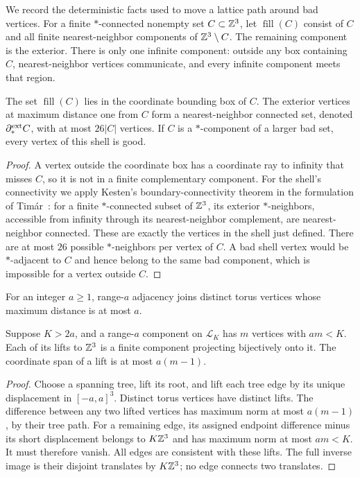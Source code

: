 We record the deterministic facts used to move a lattice path around
bad vertices.  For a finite $*$-connected nonempty set $C\subset\mathbb Z^3$,
let $\operatorname{fill}(C)$ consist of $C$ and all finite
nearest-neighbor components of $\mathbb Z^3\setminus C$.  The remaining
component is the exterior.  There is only one infinite component:
outside any box containing $C$, nearest-neighbor vertices communicate,
and every infinite component meets that region.

\begin{lemma}\label{lat:boundary}
The set $\operatorname{fill}(C)$ lies in the coordinate bounding box of
$C$.  The exterior vertices at maximum distance one from $C$ form a
nearest-neighbor connected set, denoted $\partial_*^{\rm ext}C$,
with at most $26|C|$ vertices.  If $C$ is a $*$-component of a larger
bad set, every vertex of this shell is good.
\end{lemma}
\begin{proof}
A vertex outside the coordinate box has a coordinate ray to infinity
that misses $C$, so it is not in a finite complementary component.
For the shell's connectivity we apply Kesten's boundary-connectivity
theorem in the formulation of Tim\'ar~\cite[arXiv version~2, Theorem~4]{Timar2013}:
for a finite $*$-connected subset of $\mathbb Z^3$, its exterior
$*$-neighbors, accessible from infinity through its nearest-neighbor
complement, are nearest-neighbor connected.  These are exactly the
vertices in the shell just defined.  There are at most $26$ possible
$*$-neighbors per vertex of $C$.  A bad shell vertex would be
$*$-adjacent to $C$ and hence belong to the same bad component,
which is impossible for a vertex outside $C$.
\end{proof}

For an integer $a\ge1$, range-$a$ adjacency joins distinct torus
vertices whose maximum distance is at most $a$.

\begin{lemma}\label{lat:small-lifts}
Suppose $K>2a$, and a range-$a$ component on $\mathcal L_K$ has
$m$ vertices with $am<K$.  Each of its lifts to $\mathbb Z^3$ is a finite
component projecting bijectively onto it.  The coordinate span of a lift
is at most $a(m-1)$.
\end{lemma}
\begin{proof}
Choose a spanning tree, lift its root, and lift each tree edge by its
unique displacement in $[-a,a]^3$.  Distinct torus vertices have distinct
lifts.  The difference between any two lifted vertices has maximum norm
at most $a(m-1)$, by their tree path.  For a remaining edge, its assigned
endpoint difference minus its short displacement belongs to $K\mathbb Z^3$
and has maximum norm at most $am<K$.  It must therefore vanish.
All edges are consistent with these lifts.  The full inverse image is
their disjoint translates by $K\mathbb Z^3$; no edge connects two translates.
\end{proof}


